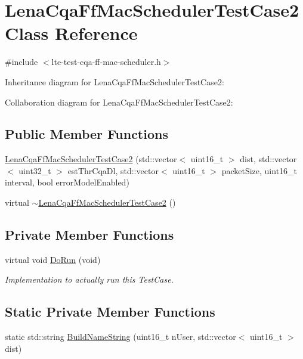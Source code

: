 \hypertarget{classLenaCqaFfMacSchedulerTestCase2}{}\section{Lena\+Cqa\+Ff\+Mac\+Scheduler\+Test\+Case2 Class Reference}
\label{classLenaCqaFfMacSchedulerTestCase2}


{\ttfamily \#include $<$lte-\/test-\/cqa-\/ff-\/mac-\/scheduler.\+h$>$}



Inheritance diagram for Lena\+Cqa\+Ff\+Mac\+Scheduler\+Test\+Case2\+:


Collaboration diagram for Lena\+Cqa\+Ff\+Mac\+Scheduler\+Test\+Case2\+:
\subsection*{Public Member Functions}
\begin{DoxyCompactItemize}
\item 
\hyperlink{classLenaCqaFfMacSchedulerTestCase2_a17f8de49223dfd920064f7e82efd74ab}{Lena\+Cqa\+Ff\+Mac\+Scheduler\+Test\+Case2} (std\+::vector$<$ uint16\+\_\+t $>$ dist, std\+::vector$<$ uint32\+\_\+t $>$ est\+Thr\+Cqa\+Dl, std\+::vector$<$ uint16\+\_\+t $>$ packet\+Size, uint16\+\_\+t interval, bool error\+Model\+Enabled)
\item 
virtual \hyperlink{classLenaCqaFfMacSchedulerTestCase2_a3e4f2ad5a30efcb0c6df30aed61dead7}{$\sim$\+Lena\+Cqa\+Ff\+Mac\+Scheduler\+Test\+Case2} ()
\end{DoxyCompactItemize}
\subsection*{Private Member Functions}
\begin{DoxyCompactItemize}
\item 
virtual void \hyperlink{classLenaCqaFfMacSchedulerTestCase2_a773e8490a80a3afe50adf54d713d3e4a}{Do\+Run} (void)
\begin{DoxyCompactList}\small\item\em Implementation to actually run this Test\+Case. \end{DoxyCompactList}\end{DoxyCompactItemize}
\subsection*{Static Private Member Functions}
\begin{DoxyCompactItemize}
\item 
static std\+::string \hyperlink{classLenaCqaFfMacSchedulerTestCase2_a953358afeefd0acb636b95f77318fb26}{Build\+Name\+String} (uint16\+\_\+t n\+User, std\+::vector$<$ uint16\+\_\+t $>$ dist)
\end{DoxyCompactItemize}
